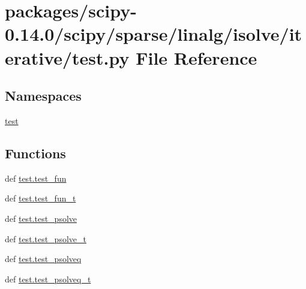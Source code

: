 \hypertarget{scipy-0_814_80_2scipy_2sparse_2linalg_2isolve_2iterative_2test_8py}{}\section{packages/scipy-\/0.14.0/scipy/sparse/linalg/isolve/iterative/test.py File Reference}
\label{scipy-0_814_80_2scipy_2sparse_2linalg_2isolve_2iterative_2test_8py}
\subsection*{Namespaces}
\begin{DoxyCompactItemize}
\item 
 \hyperlink{namespacetest}{test}
\end{DoxyCompactItemize}
\subsection*{Functions}
\begin{DoxyCompactItemize}
\item 
def \hyperlink{namespacetest_ad4d6e3be622f358cce39cc22ba1e7bfb}{test.\+test\+\_\+fun}
\item 
def \hyperlink{namespacetest_a16eeec31c11f0bd88e6e0d8b1d5a188c}{test.\+test\+\_\+fun\+\_\+t}
\item 
def \hyperlink{namespacetest_a0f0383a76aa4c59bae2fa5d6aafadf3d}{test.\+test\+\_\+psolve}
\item 
def \hyperlink{namespacetest_a15a41e6873970cbc3315820370310580}{test.\+test\+\_\+psolve\+\_\+t}
\item 
def \hyperlink{namespacetest_ab6e86066fa873ee3c154fa2394282875}{test.\+test\+\_\+psolveq}
\item 
def \hyperlink{namespacetest_a96b22162e2f7232b223167ec3a9f66a6}{test.\+test\+\_\+psolveq\+\_\+t}
\end{DoxyCompactItemize}
